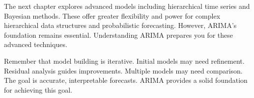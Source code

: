 The next chapter explores advanced models including hierarchical time series and Bayesian methods. These offer greater flexibility and power for complex hierarchical data structures and probabilistic forecasting. However, ARIMA's foundation remains essential. Understanding ARIMA prepares you for these advanced techniques.

Remember that model building is iterative. Initial models may need refinement. Residual analysis guides improvements. Multiple models may need comparison. The goal is accurate, interpretable forecasts. ARIMA provides a solid foundation for achieving this goal.



